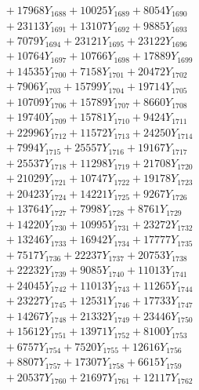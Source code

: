 \documentclass[a4paper,10pt]{article}
\begin{document}
{\begin{align}
&\;  + 17968 Y_{1688} + 10025 Y_{1689} + 8054 Y_{1690} \\[0.3ex]
&\;  + 23113 Y_{1691} + 13107 Y_{1692} + 9885 Y_{1693} \\[0.3ex]
&\;  + 7079 Y_{1694} + 23121 Y_{1695} + 23122 Y_{1696} \\[0.3ex]
&\;  + 10764 Y_{1697} + 10766 Y_{1698} + 17889 Y_{1699} \\[0.3ex]
&\;  + 14535 Y_{1700} + 7158 Y_{1701} + 20472 Y_{1702} \\[0.3ex]
&\;  + 7906 Y_{1703} + 15799 Y_{1704} + 19714 Y_{1705} \\[0.3ex]
&\;  + 10709 Y_{1706} + 15789 Y_{1707} + 8660 Y_{1708} \\[0.5ex]\allowbreak
&\;  + 19740 Y_{1709} + 15781 Y_{1710} + 9424 Y_{1711} \\[0.3ex]
&\;  + 22996 Y_{1712} + 11572 Y_{1713} + 24250 Y_{1714} \\[0.3ex]
&\;  + 7994 Y_{1715} + 25557 Y_{1716} + 19167 Y_{1717} \\[0.3ex]
&\;  + 25537 Y_{1718} + 11298 Y_{1719} + 21708 Y_{1720} \\[0.3ex]
&\;  + 21029 Y_{1721} + 10747 Y_{1722} + 19178 Y_{1723} \\[0.3ex]
&\;  + 20423 Y_{1724} + 14221 Y_{1725} + 9267 Y_{1726} \\[0.3ex]
&\;  + 13764 Y_{1727} + 7998 Y_{1728} + 8761 Y_{1729} \\[0.3ex]
&\;  + 14220 Y_{1730} + 10995 Y_{1731} + 23272 Y_{1732} \\[0.3ex]
&\;  + 13246 Y_{1733} + 16942 Y_{1734} + 17777 Y_{1735} \\[0.3ex]
&\;  + 7517 Y_{1736} + 22237 Y_{1737} + 20753 Y_{1738} \\[0.5ex]\allowbreak
&\;  + 22232 Y_{1739} + 9085 Y_{1740} + 11013 Y_{1741} \\[0.3ex]
&\;  + 24045 Y_{1742} + 11013 Y_{1743} + 11265 Y_{1744} \\[0.3ex]
&\;  + 23227 Y_{1745} + 12531 Y_{1746} + 17733 Y_{1747} \\[0.3ex]
&\;  + 14267 Y_{1748} + 21332 Y_{1749} + 23446 Y_{1750} \\[0.3ex]
&\;  + 15612 Y_{1751} + 13971 Y_{1752} + 8100 Y_{1753} \\[0.3ex]
&\;  + 6757 Y_{1754} + 7520 Y_{1755} + 12616 Y_{1756} \\[0.3ex]
&\;  + 8807 Y_{1757} + 17307 Y_{1758} + 6615 Y_{1759} \\[0.3ex]
&\;  + 20537 Y_{1760} + 21697 Y_{1761} + 12117 Y_{1762} \\[0.3ex]

\end{align}}
\end{document}
